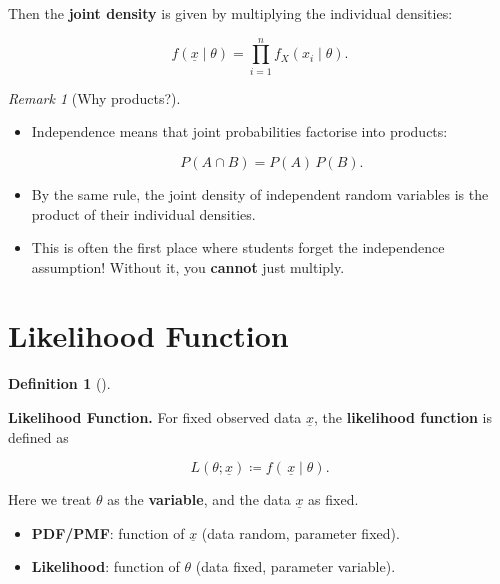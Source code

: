 \documentclass[
  letterpaper,
  DIV=11,
  numbers=noendperiod]{scrreprt}
\providecommand{\tightlist}{%
  \setlength{\itemsep}{0pt}\setlength{\parskip}{0pt}}
\theoremstyle{definition}
\theoremstyle{plain}
\theoremstyle{definition}
\newtheorem{definition}{Definition}[chapter]
\theoremstyle{remark}
\newtheorem{refremark}{Remark}[chapter]
\begin{document}
Then the \textbf{joint density} is given by multiplying the individual
densities:

\[
f(\underline{x} \mid \theta) 
= \prod_{i=1}^n f_X(x_i \mid \theta).
\]

\begin{refremark}[Why products?]
\leavevmode

\begin{itemize}
\item
  Independence means that joint probabilities factorise into products:

  \[
  P(A \cap B) = P(A)\,P(B).
  \]
\item
  By the same rule, the joint density of independent random variables is
  the product of their individual densities.
\item
  This is often the first place where students forget the independence
  assumption! Without it, you \textbf{cannot} just multiply.
\end{itemize}

\label{rem-products}

\end{refremark}

\section{Likelihood Function}\label{likelihood-function}

\begin{definition}[]\protect\hypertarget{def-likelihood}{}\label{def-likelihood}

\textbf{Likelihood Function.} For fixed observed data \(\underline{x}\),
the \textbf{likelihood function} is defined as

\[
L(\theta ; \underline{x}) \coloneqq f(\,\underline{x} \mid \theta).
\]

Here we treat \(\theta\) as the \textbf{variable}, and the data
\(\underline{x}\) as fixed.

\end{definition}

\begin{tcolorbox}[enhanced jigsaw, left=2mm, toprule=.15mm, breakable, opacityback=0, titlerule=0mm, toptitle=1mm, colbacktitle=quarto-callout-tip-color!10!white, colframe=quarto-callout-tip-color-frame, coltitle=black, rightrule=.15mm, leftrule=.75mm, bottomrule=.15mm, arc=.35mm, bottomtitle=1mm, title=\textcolor{quarto-callout-tip-color}{\faLightbulb}\hspace{0.5em}{Likelihood vs.~Probability:}, colback=white, opacitybacktitle=0.6]

\begin{itemize}
\tightlist
\item
  \textbf{PDF/PMF}: function of \(\underline{x}\) (data random,
  parameter fixed).
\item
  \textbf{Likelihood}: function of \(\theta\) (data fixed, parameter
  variable).
\end{itemize}

\end{tcolorbox}
\end{document}
